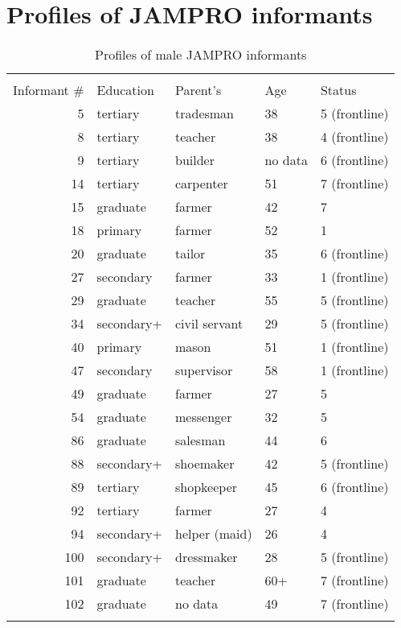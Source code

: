 \chapter{Profiles of JAMPRO informants}\label{appendix2}

\begin{table}
\begin{tabular}{rllll}
\lsptoprule
\multicolumn{5}{c}{Males}\\\cmidrule(lr){1-5}
Informant \# & Education & Parent's & Age & Status\\\midrule
5   & tertiary   & tradesman  & 38       & 5 (frontline)\\
8   & tertiary   & teacher    & 38       & 4 (frontline)\\
9   & tertiary   & builder    & no data  & 6 (frontline)\\
14  & tertiary   & carpenter  & 51       & 7 (frontline)\\
15  & graduate   & farmer     & 42       & 7            \\
18  & primary    & farmer     & 52       & 1            \\
20  & graduate   & tailor     & 35       & 6 (frontline)\\
27  & secondary  & farmer     & 33       & 1 (frontline)\\
29  & graduate   & teacher    & 55       & 5 (frontline)\\
34  & secondary+ &   civil servant & 29  & 5 (frontline)\\
40  & primary    &   mason         & 51  & 1 (frontline)\\
47  & secondary  &   supervisor    & 58  & 1 (frontline)\\
49  & graduate   &   farmer        & 27  & 5            \\
54  & graduate   &   messenger     & 32  & 5            \\
86  & graduate   &   salesman      & 44  & 6            \\
88  & secondary+ &   shoemaker     & 42  & 5 (frontline)\\
89  & tertiary   &   shopkeeper    & 45  & 6 (frontline)\\
92  & tertiary   &   farmer        & 27  & 4            \\
94  & secondary+ &   helper (maid) & 26  & 4            \\
100 &  secondary+ &  dressmaker    & 28  & 5 (frontline)\\
101 &  graduate   &  teacher       & 60+ & 7 (frontline)\\
102 &  graduate   &  no data       & 49  & 7 (frontline)\\
\lspbottomrule
\end{tabular}
\caption{Profiles of male JAMPRO informants}
\end{table}

